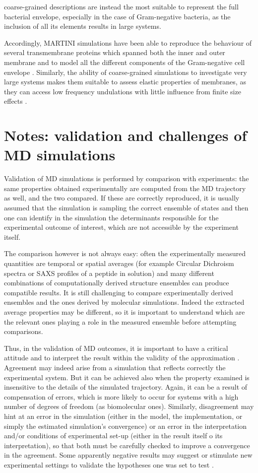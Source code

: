 \documentclass[graybox]{svmult}
\begin{document}
coarse-grained descriptions are instead the most suitable to represent the full bacterial envelope, especially in the case of Gram-negative bacteria, as the inclusion of all its elements results in large systems.

Accordingly, MARTINI simulations have been able to reproduce the behaviour of several transmembrane proteins which spanned both the inner and outer membrane \cite{Hsu2017} and to model all the different components of the Gram-negative cell envelope \cite{Khalid2019}.
%
Similarly, the ability of coarse-grained simulations to investigate very large systems makes them suitable to assess elastic properties of membranes, as they can access low frequency undulations with little influence from finite size effects \cite{Fowler2016}.


\section{Notes: validation and challenges of MD simulations}

Validation of MD simulations is performed by comparison with experiments: the same properties obtained experimentally are computed from the MD trajectory as well, and the two compared. If these are correctly reproduced, it is usually assumed that the simulation is sampling the correct ensemble of states and then one can identify in the simulation the determinants responsible for the experimental outcome of interest, which are not accessible by the experiment itself.

The comparison however is not always easy: often the experimentally measured quantities are temporal or spatial averages (for example Circular Dichroism spectra or SAXS profiles of a peptide in solution) and many different combinations of computationally derived structure ensembles can produce compatible results. It is still challenging to compare experimentally derived ensembles and the ones derived by molecular simulations. Indeed the extracted average properties may be different, so it is important to understand which are the relevant ones playing a role in the measured ensemble before attempting comparisons.

Thus, in the validation of MD outcomes, it is important to have a critical attitude and to interpret the result within the validity of the approximation \cite{VanGunsteren2008}.
%
Agreement may indeed arise from a simulation that reflects correctly the experimental system. But it can be achieved also when the property examined is insensitive to the details of the simulated trajectory. Again, it can be a result of compensation of errors, which is more likely to occur for systems with a high number of degrees of freedom (as biomolecular ones).
%
Similarly, disagreement may hint at an error in the simulation (either in the model, the implementation, or simply the estimated simulation's convergence) or an error in the interpretation and/or conditions of experimental set-up (either in the result itself o its interpretation), so that both must be carefully checked to improve a convergence in the agreement.
%
Some apparently negative results may suggest or stimulate new experimental settings to validate the hypotheses one was set to test \cite{Goncalves2013,Meissner2014}.
\end{document}

